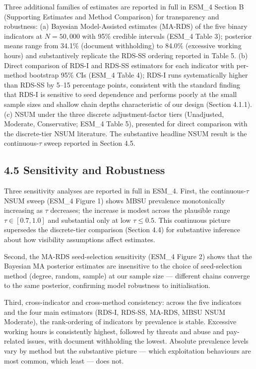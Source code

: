 \documentclass[
  12pt,
  letterpaper,
  DIV=11,
  numbers=noendperiod]{scrartcl}
\begin{document}
Three additional families of estimates are reported in full in ESM\_4
Section B (Supporting Estimates and Method Comparison) for transparency
and robustness: (a) Bayesian Model-Assisted estimates (MA-RDS) of the
five binary indicators at \(N = 50{,}000\) with 95\% credible intervals
(ESM\_4 Table 3); posterior means range from 34.1\% (document
withholding) to 84.0\% (excessive working hours) and substantively
replicate the RDS-SS ordering reported in Table 5. (b) Direct comparison
of RDS-I and RDS-SS estimators for each indicator with per-method
bootstrap 95\% CIs (ESM\_4 Table 4); RDS-I runs systematically higher
than RDS-SS by 5--15 percentage points, consistent with the standard
finding that RDS-I is sensitive to seed dependence and performs poorly
at the small sample sizes and shallow chain depths characteristic of our
design (Section 4.1.1). (c) NSUM under the three discrete
adjustment-factor tiers (Unadjusted, Moderate, Conservative; ESM\_4
Table 5), presented for direct comparison with the discrete-tier NSUM
literature. The substantive headline NSUM result is the
continuous-\(\tau\) sweep reported in Section 4.5.

\subsection{4.5 Sensitivity and
Robustness}\label{sensitivity-and-robustness}

Three sensitivity analyses are reported in full in ESM\_4. First, the
continuous-\(\tau\) NSUM sweep (ESM\_4 Figure 1) shows MBSU prevalence
monotonically increasing as \(\tau\) decreases; the increase is modest
across the plausible range \(\tau \in [0.7, 1.0]\) and substantial only
at low \(\tau \le 0.5\). This continuous picture supersedes the
discrete-tier comparison (Section 4.4) for substantive inference about
how visibility assumptions affect estimates.

Second, the MA-RDS seed-selection sensitivity (ESM\_4 Figure 2) shows
that the Bayesian MA posterior estimates are insensitive to the choice
of seed-selection method (degree, random, sample) at our sample size ---
different chains converge to the same posterior, confirming model
robustness to initialisation.

Third, cross-indicator and cross-method consistency: across the five
indicators and the four main estimators (RDS-I, RDS-SS, MA-RDS, MBSU
NSUM Moderate), the rank-ordering of indicators by prevalence is stable.
Excessive working hours is consistently highest, followed by threats and
abuse and pay-related issues, with document withholding the lowest.
Absolute prevalence levels vary by method but the substantive picture
--- which exploitation behaviours are most common, which least --- does
not.
\end{document}
